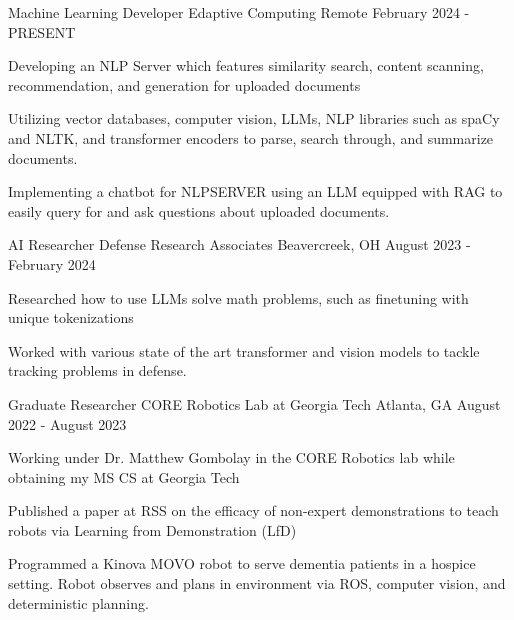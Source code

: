 
\begin{cventries}

\cventry
    {Machine Learning Developer} %
    {Edaptive Computing} %
    {Remote} %
    {February 2024 - PRESENT} %
    {
      \begin{cvitems} %
        \item {Developing an NLP Server which features similarity search, content scanning, recommendation, and generation for uploaded documents}
        \item {Utilizing vector databases, computer vision, LLMs, NLP libraries such as spaCy and NLTK, and transformer encoders to parse, search through, and summarize documents.}
        \item {Implementing a chatbot for NLPSERVER using an LLM equipped with RAG to easily query for and ask questions about uploaded documents.}
      \end{cvitems}
    }
    
\cventry
    {AI Researcher} %
    {Defense Research Associates} %
    {Beavercreek, OH} %
    {August 2023 - February 2024} %
    {
      \begin{cvitems} %
        \item {Researched how to use LLMs solve math problems, such as finetuning with unique tokenizations}
        \item {Worked with various state of the art transformer and vision models to tackle tracking problems in defense.}
      \end{cvitems}
    }

\cventry
    {Graduate Researcher} %
    {CORE Robotics Lab at Georgia Tech} %
    {Atlanta, GA} %
    {August 2022 - August 2023} %
    {
      \begin{cvitems} %
        \item {Working under Dr. Matthew Gombolay in the CORE Robotics lab while obtaining my MS CS at Georgia Tech}
        \item {Published a paper at RSS on the efficacy of non-expert demonstrations to teach robots via Learning from Demonstration (LfD)}
        \item {Programmed a Kinova MOVO robot to serve dementia patients in a hospice setting. Robot observes and plans in environment via ROS, computer vision, and deterministic planning.}
      \end{cvitems}
    }


\end{cventries}
